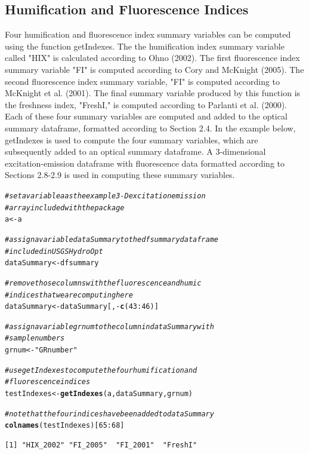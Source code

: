 \documentclass[a4paper,11pt]{article}\usepackage[]{graphicx}\usepackage[]{color}
\makeatletter
\newcommand{\hlnum}[1]{\textcolor[rgb]{0.686,0.059,0.569}{#1}}%
\newcommand{\hlstr}[1]{\textcolor[rgb]{0.192,0.494,0.8}{#1}}%
\newcommand{\hlcom}[1]{\textcolor[rgb]{0.678,0.584,0.686}{\textit{#1}}}%
\newcommand{\hlopt}[1]{\textcolor[rgb]{0,0,0}{#1}}%
\newcommand{\hlstd}[1]{\textcolor[rgb]{0.345,0.345,0.345}{#1}}%
\newcommand{\hlkwb}[1]{\textcolor[rgb]{0.69,0.353,0.396}{#1}}%
\newcommand{\hlkwd}[1]{\textcolor[rgb]{0.737,0.353,0.396}{\textbf{#1}}}%
\newenvironment{kframe}{%
 \def\at@end@of@kframe{}%
 \ifinner\ifhmode%
  \def\at@end@of@kframe{\end{minipage}}%
  \begin{minipage}{\columnwidth}%
 \fi\fi%
 \def\FrameCommand##1{\hskip\@totalleftmargin \hskip-\fboxsep
 \colorbox{shadecolor}{##1}\hskip-\fboxsep
     \hskip-\linewidth \hskip-\@totalleftmargin \hskip\columnwidth}%
 \MakeFramed {\advance\hsize-\width
   \@totalleftmargin\z@ \linewidth\hsize
   \@setminipage}}%
 {\par\unskip\endMakeFramed%
 \at@end@of@kframe}
\newenvironment{knitrout}{}{} %
\makeatother
\begin{document}
\subsection{Humification and Fluorescence Indices}
Four humification and fluorescence index summary variables can be computed using the function getIndexes. The the humification index summary variable called "HIX" is calculated according to Ohno (2002). The first fluorescence index summary variable "FI" is computed according to Cory and McKnight (2005). The second fluorescence index summary variable, "FI" is computed according to McKnight et al. (2001). The final summary variable produced by this function is the freshness index, "FreshI," is computed according to Parlanti et al. (2000). Each of these four summary variables are computed and added to the optical summary dataframe, formatted according to Section 2.4. In the example below, getIndexes is used to compute the four summary variables, which are subsequently added to an optical summary dataframe. A 3-dimensional excitation-emission dataframe with fluorescence data formatted according to Sections 2.8-2.9 is used in computing these summary variables.

\begin{knitrout}
\color{fgcolor}\begin{kframe}
\begin{alltt}
\hlcom{# set a variable a as the example 3-D excitation emission}
\hlcom{# array included with the package}
\hlstd{a} \hlkwb{<-} \hlstd{a}

\hlcom{# assign a variable dataSummary to the dfsummary dataframe}
\hlcom{# included in USGSHydroOpt}
\hlstd{dataSummary} \hlkwb{<-} \hlstd{dfsummary}

\hlcom{# remove those columns with the fluorescence and humic}
\hlcom{# indices that we are computing here}
\hlstd{dataSummary} \hlkwb{<-} \hlstd{dataSummary[,} \hlopt{-}\hlkwd{c}\hlstd{(}\hlnum{43}\hlopt{:}\hlnum{46}\hlstd{)]}

\hlcom{# assign a variable grnum to the column in dataSummary with}
\hlcom{# sample numbers}
\hlstd{grnum} \hlkwb{<-} \hlstr{"GRnumber"}

\hlcom{# use getIndexes to compute the four humification and}
\hlcom{# fluorescence indices}
\hlstd{testIndexes} \hlkwb{<-} \hlkwd{getIndexes}\hlstd{(a, dataSummary, grnum)}

\hlcom{# note that the four indices have been added to dataSummary}
\hlkwd{colnames}\hlstd{(testIndexes)[}\hlnum{65}\hlopt{:}\hlnum{68}\hlstd{]}
\end{alltt}
\begin{verbatim}
[1] "HIX_2002" "FI_2005"  "FI_2001"  "FreshI"  
\end{verbatim}
\end{kframe}
\end{knitrout}
\end{document}
